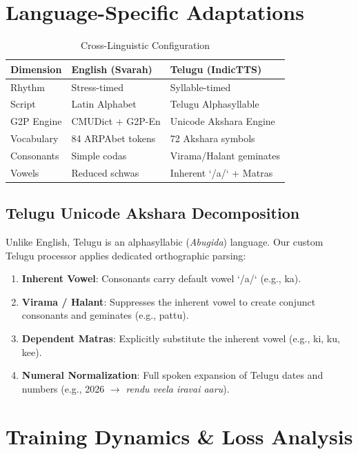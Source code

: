 \documentclass[10pt,twocolumn,a4paper]{article}
\begin{document}
\section{Language-Specific Adaptations}

\begin{table}[h]
\centering
\small
\caption{Cross-Linguistic Configuration}
\label{tab:lang_diff}
\begin{tabularx}{\columnwidth}{lXX}
\toprule
\textbf{Dimension} & \textbf{English (Svarah)} & \textbf{Telugu (IndicTTS)} \\
\midrule
Rhythm & Stress-timed & Syllable-timed \\
Script & Latin Alphabet & Telugu Alphasyllable \\
G2P Engine & CMUDict + G2P-En & Unicode Akshara Engine \\
Vocabulary & 84 ARPAbet tokens & 72 Akshara symbols \\
Consonants & Simple codas & Virama/Halant geminates \\
Vowels & Reduced schwas & Inherent `/a/` + Matras \\
\bottomrule
\end{tabularx}
\end{table}

\subsection{Telugu Unicode Akshara Decomposition}
Unlike English, Telugu is an alphasyllabic (\textit{Abugida}) language. Our custom Telugu processor applies dedicated orthographic parsing:
\begin{enumerate}[noitemsep]
    \item \textbf{Inherent Vowel}: Consonants carry default vowel `/a/` (e.g., ka).
    \item \textbf{Virama / Halant}: Suppresses the inherent vowel to create conjunct consonants and geminates (e.g., pattu).
    \item \textbf{Dependent Matras}: Explicitly substitute the inherent vowel (e.g., ki, ku, kee).
    \item \textbf{Numeral Normalization}: Full spoken expansion of Telugu dates and numbers (e.g., 2026 $\to$ \textit{rendu veela iravai aaru}).
\end{enumerate}

\section{Training Dynamics \& Loss Analysis}
\end{document}
